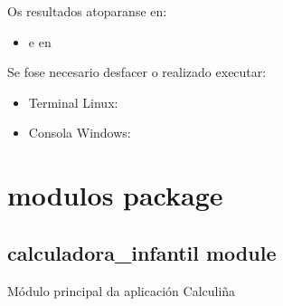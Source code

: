 \documentclass[letterpaper,10pt,spanish]{sphinxmanual}
\begin{document}
\sphinxAtStartPar
Os resultados atoparanse en:
\begin{itemize}
\item {} 
\sphinxAtStartPar
{} e en 

\end{itemize}

\sphinxAtStartPar
Se fose necesario desfacer o realizado executar:
\begin{itemize}
\item {} 
\sphinxAtStartPar
Terminal Linux: 

\item {} 
\sphinxAtStartPar
Consola Windows: 

\end{itemize}


\chapter{modulos package}
\label{\detokenize{api/modulos:module-modulos}}\label{\detokenize{api/modulos:modulos-package}}\label{\detokenize{api/modulos::doc}}

\section{calculadora\_infantil module}
\label{\detokenize{api/modulos:module-calculadora_infantil}}\label{\detokenize{api/modulos:calculadora-infantil-module}}
\sphinxAtStartPar
Módulo principal da aplicación Calculiña
\end{document}
